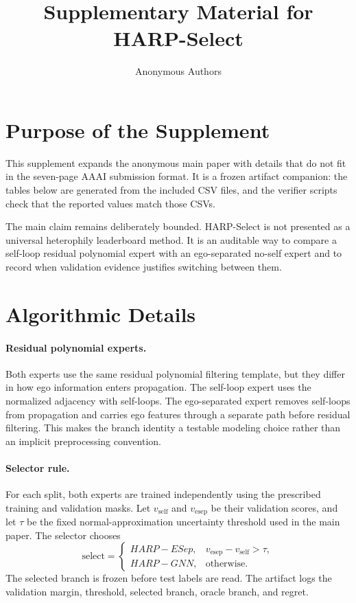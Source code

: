 \documentclass[10pt]{article}
\title{Supplementary Material for HARP-Select}
\author{Anonymous Authors}
\date{}
\newcommand{\method}{HARP-Select}
\newcommand{\base}{HARP-GNN}
\newcommand{\esep}{HARP-ESep}
\begin{document}
\maketitle

\section{Purpose of the Supplement}

This supplement expands the anonymous main paper with details that do not fit
in the seven-page AAAI submission format.  It is a frozen artifact companion:
the tables below are generated from the included CSV files, and the verifier
scripts check that the reported values match those CSVs.

The main claim remains deliberately bounded.  \method{} is not presented as a
universal heterophily leaderboard method.  It is an auditable way to compare a
self-loop residual polynomial expert with an ego-separated no-self expert and
to record when validation evidence justifies switching between them.

\section{Algorithmic Details}

\paragraph{Residual polynomial experts.}
Both experts use the same residual polynomial filtering template, but they
differ in how ego information enters propagation.  The self-loop expert uses
the normalized adjacency with self-loops.  The ego-separated expert removes
self-loops from propagation and carries ego features through a separate path
before residual filtering.  This makes the branch identity a testable modeling
choice rather than an implicit preprocessing convention.

\paragraph{Selector rule.}
For each split, both experts are trained independently using the prescribed
training and validation masks.  Let $v_{\mathrm{self}}$ and
$v_{\mathrm{esep}}$ be their validation scores, and let $\tau$ be the fixed
normal-approximation uncertainty threshold used in the main paper.  The
selector chooses
\[
  \mathrm{select} =
  \begin{cases}
  \esep, & v_{\mathrm{esep}} - v_{\mathrm{self}} > \tau,\\
  \base, & \text{otherwise}.
  \end{cases}
\]
The selected branch is frozen before test labels are read.  The artifact logs
the validation margin, threshold, selected branch, oracle branch, and regret.
\end{document}
